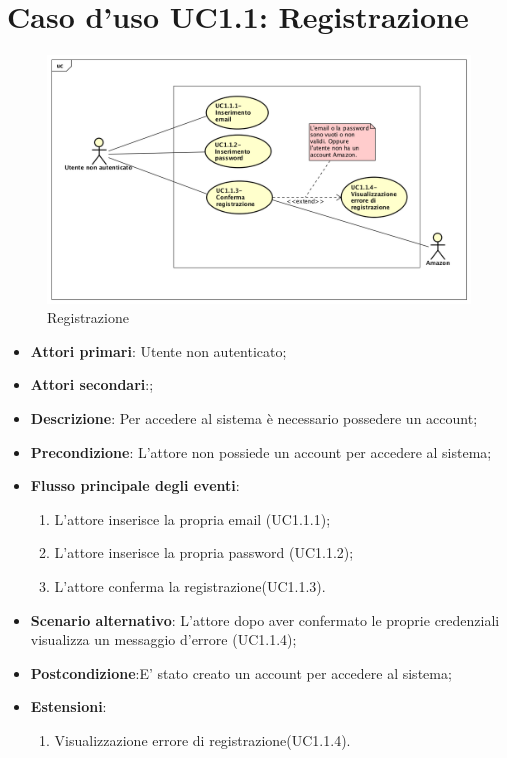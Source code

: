 \section{Caso d'uso UC1.1: Registrazione}
\begin{figure} [h]
	\centering
	\includegraphics[scale=0.4]{./Diagram/UC1-1.png}
	\caption{Registrazione}\label{}
\end{figure}
\begin{itemize}
	\item \textbf{Attori primari}: Utente non autenticato;
	\item \textbf{Attori secondari}:;
	\item \textbf{Descrizione}: Per accedere al sistema è necessario possedere un account;
	\item \textbf{Precondizione}: L'attore non possiede un account per accedere al sistema;
	\item \textbf{Flusso principale degli eventi}: 
	\begin{enumerate}
		\item L'attore inserisce la propria email (UC1.1.1);
		\item L'attore inserisce la propria password (UC1.1.2);
		\item L'attore conferma la registrazione(UC1.1.3).
	\end{enumerate}
		\item \textbf{Scenario alternativo}: L'attore dopo aver confermato le proprie credenziali visualizza un messaggio d'errore (UC1.1.4);
		\item \textbf{Postcondizione}:E' stato creato un account per accedere al sistema;
		\item \textbf{Estensioni}:
	\begin{enumerate}
		\item	Visualizzazione errore di registrazione(UC1.1.4).
	\end{enumerate}
\end{itemize}

